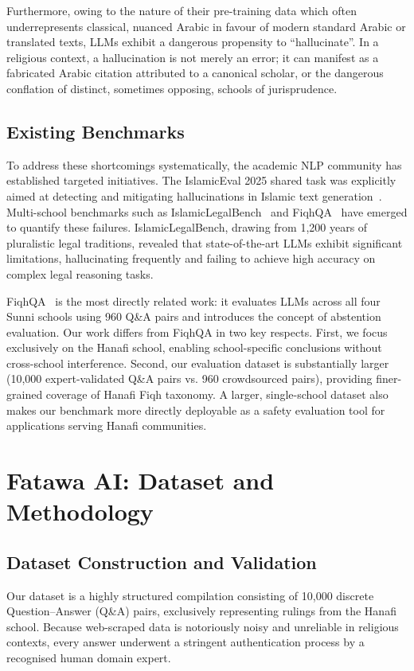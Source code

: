 \documentclass[runningheads]{llncs}
\begin{document}
Furthermore, owing to the nature of their pre-training data which often underrepresents classical, nuanced Arabic in favour of modern standard Arabic or translated texts, LLMs exhibit a dangerous propensity to ``hallucinate''. In a religious context, a hallucination is not merely an error; it can manifest as a fabricated Arabic citation attributed to a canonical scholar, or the dangerous conflation of distinct, sometimes opposing, schools of jurisprudence.

\subsection{Existing Benchmarks}
To address these shortcomings systematically, the academic NLP community has established targeted initiatives. The IslamicEval 2025 shared task was explicitly aimed at detecting and mitigating hallucinations in Islamic text generation~\cite{islamicEval2025}. Multi-school benchmarks such as IslamicLegalBench~\cite{elmahjub2026islamiclegalbench} and FiqhQA~\cite{atif2025fiqhqa} have emerged to quantify these failures. IslamicLegalBench, drawing from 1{,}200 years of pluralistic legal traditions, revealed that state-of-the-art LLMs exhibit significant limitations, hallucinating frequently and failing to achieve high accuracy on complex legal reasoning tasks.

FiqhQA~\cite{atif2025fiqhqa} is the most directly related work: it evaluates LLMs across all four Sunni schools using 960 Q\&A pairs and introduces the concept of abstention evaluation. Our work differs from FiqhQA in two key respects. First, we focus exclusively on the Hanafi school, enabling school-specific conclusions without cross-school interference. Second, our evaluation dataset is substantially larger (10{,}000 expert-validated Q\&A pairs vs. 960 crowdsourced pairs), providing finer-grained coverage of Hanafi Fiqh taxonomy. A larger, single-school dataset also makes our benchmark more directly deployable as a safety evaluation tool for applications serving Hanafi communities.

\section{Fatawa AI: Dataset and Methodology}

\subsection{Dataset Construction and Validation}
Our dataset is a highly structured compilation consisting of 10{,}000 discrete Question--Answer (Q\&A) pairs, exclusively representing rulings from the Hanafi school. Because web-scraped data is notoriously noisy and unreliable in religious contexts, every answer underwent a stringent authentication process by a recognised human domain expert.
\end{document}
